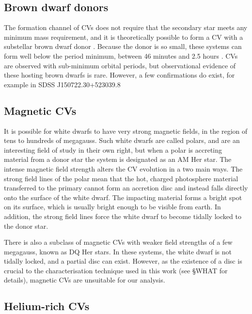 \subsection{Brown dwarf donors}
\label{sect:introduction:brown dwarf donors}

The formation channel of CVs does not require that the secondary star meets any minimum mass requirement, and it is theoretically possible to form a CV with a substellar brown dwarf donor \citep{politano2002,politano2004}. Because the donor is so small, these systems can form well below the period minimum, between 46 minutes and 2.5 hours \citep{politano2004}. CVs are observed with sub-minimum orbital periods, but observational evidence of these hosting brown dwarfs is rare. However, a few confirmations do exist, for example in SDSS J150722.30+523039.8 \citep{littlefair2007}

\subsection{Magnetic CVs}
\label{sect:introduction:magnetic CVs}

It is possible for white dwarfs to have very strong magnetic fields, in the region of tens to hundreds of megagauss. Such white dwarfs are called polars, and are an interesting field of study in their own right, but when a polar is accreting material from a donor star the system is designated as an AM Her star. The intense magnetic field strength alters the CV evolution in a two main ways. The strong field lines of the polar mean that the hot, charged photosphere material transferred to the primary cannot form an accretion disc and instead falls directly onto the surface of the white dwarf. The impacting material forms a bright spot on its surface, which is usually bright enough to be visible from earth. In addition, the strong field lines force the white dwarf to become tidally locked to the donor star. 

There is also a subclass of magnetic CVs with weaker field strengths of a few megagauss, known as DQ Her stars. In these systems, the white dwarf is not tidally locked, and a partial disc can exist. However, as the existence of a disc is crucial to the characterisation technique used in this work (see \S WHAT for details), magnetic CVs are unsuitable for our analysis.

\subsection{Helium-rich CVs}
\label{sect:introduction:AM CVn}

